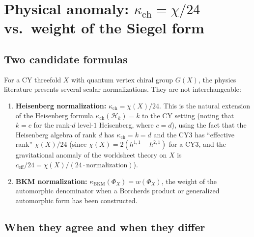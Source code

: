 \documentclass[11pt]{article}
\theoremstyle{definition}
\theoremstyle{remark}
\begin{document}
\section{Physical anomaly: $\kappa_{\mathrm{ch}} = \chi/24$ vs.\ weight of the
Siegel form}
\label{sec:chi-vs-weight}

\subsection{Two candidate formulas}

For a CY threefold $X$ with quantum vertex chiral group $G(X)$, the
physics literature presents several scalar normalizations. They are not
interchangeable:
\begin{enumerate}[label=(\Alph*)]
\item \textbf{Heisenberg normalization:}
 $\kappa_{\mathrm{ch}} = \chi(X)/24$. This is the natural extension of the
 Heisenberg formula $\kappa_{\mathrm{ch}}(\mathcal{H}_k) = k$ to the CY setting
 (noting that $k = c$ for the rank-$d$ level-$1$ Heisenberg, where $c = d$),
 using the fact that the Heisenberg algebra of rank $d$ has $\kappa_{\mathrm{ch}} = k = d$
 and the CY3 has ``effective rank'' $\chi(X)/24$ (since
 $\chi(X) = 2(h^{1,1} - h^{2,1})$ for a CY3, and the gravitational
 anomaly of the worldsheet theory on $X$ is $c_{\mathrm{eff}}/24 =
 \chi(X)/(24 \cdot \text{normalization})$).

\item \textbf{BKM normalization:}
 $\kappa_{\mathrm{BKM}}(\Phi_X)=w(\Phi_X)$, the weight of the automorphic
 denominator when a Borcherds product or generalized automorphic form has
 been constructed.
\end{enumerate}

\subsection{When they agree and when they differ}
\end{document}
